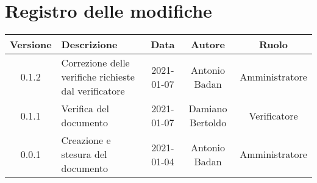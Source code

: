 \section*{Registro delle modifiche}

\begin{center}
	\begin{longtable}{|c|p{5cm}|c|c|c|}
	\hline
	\rowcolor{lighter-grayer}
	\textbf{Versione} & \textbf{Descrizione} & \textbf{Data} & \textbf{Autore} & \textbf{Ruolo} \\
	\hline
	\endfirsthead


	\hline
	0.1.2 & Correzione delle verifiche richieste dal verificatore  & 2021-01-07 & Antonio Badan & Amministratore \\
	\hline
	0.1.1 & Verifica del documento & 2021-01-07 & Damiano Bertoldo & Verificatore \\
	\hline
	0.0.1 & Creazione e stesura del documento & 2021-01-04 & Antonio Badan & Amministratore \\
	\hline
	\end{longtable}
\end{center}